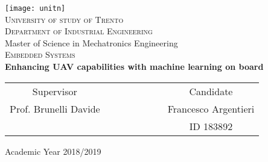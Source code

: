 \begin{titlepage}
 \begin{center}
 \texttt{[image: unitn]}\\
 \vspace{1.5em}
 {\Large \textsc{University of study of Trento}}\\
 \vspace{1.5em}
 {\Large \textsc{Department of Industrial Engineering}}\\
 \vspace{4em}
 {\normalsize Master of Science in Mechatronics Engineering}\\
 \vspace{1.5em}
 {\Large \textsc{Embedded Systems}}\\
 \vspace{4em}
 {\LARGE\textbf{
  Enhancing UAV capabilities with machine learning on board
 }}\\
 \end{center}

\vskip 2.0cm
\vskip 2.0cm
 \begin{center}
 \begin{tabular}{c c c c c c c c}
 Supervisor & & & & & & & Candidate \\[0.2cm]
 \large{Prof. Brunelli Davide} & & & & & & & \large{Francesco Argentieri}\\[0.4cm]
  & & & & & & & ID 183892\\[0.2cm]
 \end{tabular}
 \end{center}

\vskip 1.5cm
\begin{center}
{\normalsize Academic Year 2018/2019}
\end{center}
\end{titlepage}

\clearpage{\pagestyle{empty}\cleardoublepage}
